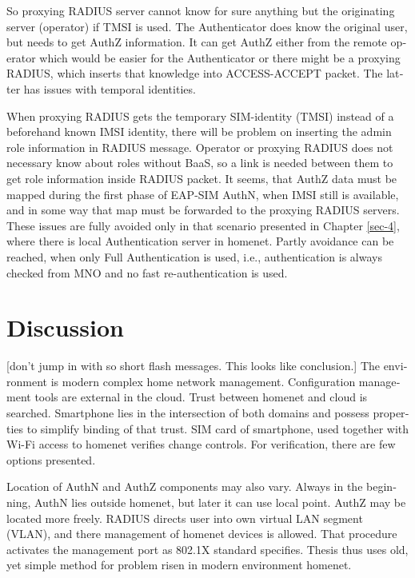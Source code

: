 \documentclass[12pt,a4paper,english]{tutthesis}
\begin{document}
\begin{otherlanguage}{english}
So proxying RADIUS server cannot know for sure anything but the
originating server (operator) if TMSI is used. The Authenticator does
know the original user, but needs to get AuthZ information. It can get
AuthZ either from the remote operator which would be easier for the
Authenticator or there might be a proxying RADIUS, which inserts that
knowledge into ACCESS-ACCEPT packet. The latter has issues with
temporal identities. 






When proxying RADIUS gets the temporary SIM-identity (TMSI) instead of
a beforehand known IMSI identity, there will be problem
on inserting the admin role information in RADIUS message.
Operator or proxying RADIUS 
does not necessary know about roles without BaaS, so a link
is needed between them to get role information inside RADIUS packet.
It seems, that AuthZ data must be mapped during the first phase of
EAP-SIM AuthN, when IMSI still is available, and in some way
that map must be forwarded to the proxying RADIUS servers.
These issues are fully avoided only in that scenario presented in Chapter
\ref{sec-4}, where there is local Authentication server in homenet.
Partly avoidance can be reached, when only Full Authentication is
used, i.e., authentication is always checked from MNO and no fast
re-authentication is used.

\section{Discussion}
\label{sec-6-6}

[don't jump in with so short flash messages. This looks like conclusion.] 
The environment is modern complex home network management.
Configuration management tools are 
external in the cloud. Trust between homenet and cloud is searched.
Smartphone lies in the intersection of both domains 
and possess properties to simplify binding of that trust.
SIM card of smartphone, used together with Wi-Fi access to homenet 
verifies change controls. For verification, there are few options presented.

Location of AuthN and AuthZ components may also vary.
Always in the beginning, AuthN lies outside homenet, but
later it can use local point. AuthZ may be located more freely.
RADIUS directs user into own virtual LAN segment (VLAN),
and there management of homenet devices is allowed.
That procedure activates the management port as 802.1X standard
specifies.
Thesis thus uses old, yet simple method for problem risen in modern environment homenet.


\end{otherlanguage}
\end{document}
